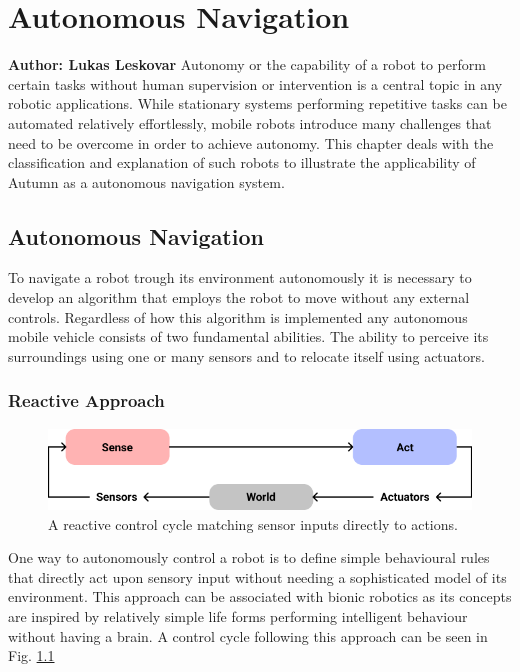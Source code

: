 \chapter{Autonomous Navigation}

\textbf{Author: Lukas Leskovar} 
Autonomy or the capability of a robot to perform certain tasks without human supervision or intervention is a central topic in any robotic applications.
While stationary systems performing repetitive tasks can be automated relatively effortlessly, mobile robots introduce many challenges that need to be overcome in order to achieve autonomy.
This chapter deals with the classification and explanation of such robots to illustrate the applicability of Autumn as a autonomous navigation system.

\section{Autonomous Navigation}
To navigate a robot trough its environment autonomously it is necessary to develop an algorithm that employs the robot to move without any external controls. Regardless of how this algorithm is implemented any autonomous mobile vehicle consists of two fundamental abilities. The ability to perceive its surroundings using one or many sensors and to relocate itself using actuators. 

\subsection{Reactive Approach}

\begin{figure}
	\centering
	\includegraphics[width=0.9\linewidth]{img/reactive}
	\caption{
		A reactive control cycle matching sensor inputs directly to actions.
	}
	\label{fig:reactiveApproach}
\end{figure}

One way to autonomously control a robot is to define simple behavioural rules that directly act upon sensory input without needing a sophisticated model of its environment. 
This approach can be associated with bionic robotics as its concepts are inspired by relatively simple life forms performing intelligent behaviour without having a brain. 
A control cycle following this approach can be seen in Fig. \ref{fig:reactiveApproach}

